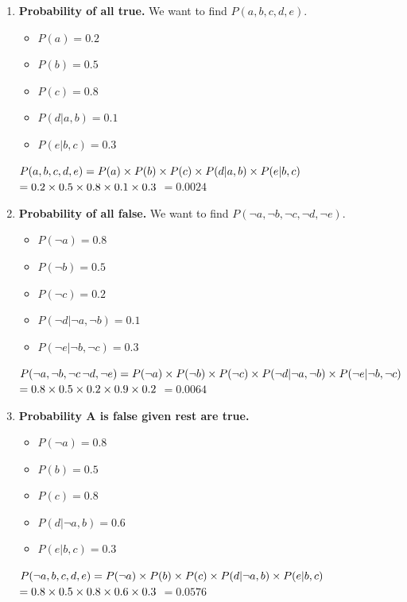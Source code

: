 \documentclass[12pt]{article}
\begin{document}
\begin{enumerate}[label=(\alph*)]
    \item \textbf{Probability of all true.} We want to find $P(a,b,c,d,e)$.
        \begin{itemize}
            \item $P(a) = 0.2$
            \item $P(b) = 0.5$
            \item $P(c) = 0.8$
            \item $P(d | a, b) = 0.1$
            \item $P(e | b, c) = 0.3$
        \end{itemize}

        $P(a,b,c,d,e) = P(a) \times P(b) \times P(c) \times P(d|a,b) \times P(e|b,c) \\$
        $= 0.2 \times 0.5 \times 0.8 \times 0.1 \times 0.3 \\$ 
        $= 0.0024$
    
    \item \textbf{Probability of all false.} We want to find $P(\neg a, \neg b, \neg c, \neg d, \neg e)$.
        \begin{itemize}
            \item $P(\neg a) = 0.8$
            \item $P(\neg b) = 0.5$
            \item $P(\neg c) = 0.2$
            \item $P(\neg d | \neg a, \neg b) = 0.1$
            \item $P(\neg e | \neg b, \neg c) = 0.3$
        \end{itemize}
        $P(\neg a, \neg b, \neg c\, \neg d, \neg e) = P(\neg a) \times P(\neg b) \times P(\neg c) \times P(\neg d|\neg a, \neg b) \times P(\neg e|\neg b, \neg c) \\$
        $= 0.8 \times 0.5 \times 0.2 \times 0.9 \times 0.2 \\$ 
        $= 0.0064$

    \item \textbf{Probability A is false given rest are true.}
        \begin{itemize}
            \item $P(\neg a) = 0.8$
            \item $P(b) = 0.5$
            \item $P(c) = 0.8$
            \item $P(d | \neg a, b) = 0.6$
            \item $P(e | b, c) = 0.3$
        \end{itemize}
         $P(\neg a,b,c,d,e) = P(\neg a) \times P(b) \times P(c) \times P(d|\neg a,b) \times P(e|b,c) \\$
        $= 0.8 \times 0.5 \times 0.8 \times 0.6 \times 0.3 \\$ 
        $= 0.0576$
\end{enumerate}
\end{document}
